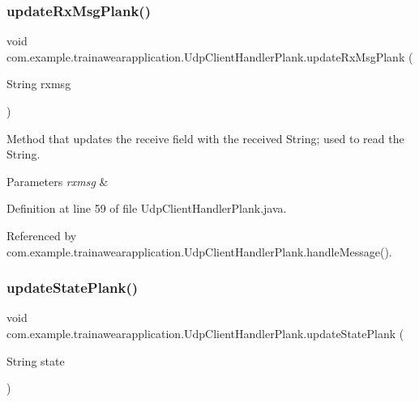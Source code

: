 \subsubsection{\texorpdfstring{updateRxMsgPlank()}{updateRxMsgPlank()}}
{\footnotesize\ttfamily void com.\+example.\+trainawearapplication.\+Udp\+Client\+Handler\+Plank.\+update\+Rx\+Msg\+Plank (\begin{DoxyParamCaption}\item[{String}]{rxmsg }\end{DoxyParamCaption})\hspace{0.3cm}{\ttfamily [private]}}



Method that updates the receive field with the received String; used to read the String. 


\begin{DoxyParams}{Parameters}
{\em rxmsg} & \\
\hline
\end{DoxyParams}


Definition at line 59 of file Udp\+Client\+Handler\+Plank.\+java.


\begin{DoxyCode}{0}

\end{DoxyCode}


Referenced by com.\+example.\+trainawearapplication.\+Udp\+Client\+Handler\+Plank.\+handle\+Message().

\mbox{\label{classcom_1_1example_1_1trainawearapplication_1_1_udp_client_handler_plank_a68ceca8349b52704db25834ca5eb5b38}} 
\subsubsection{\texorpdfstring{updateStatePlank()}{updateStatePlank()}}
{\footnotesize\ttfamily void com.\+example.\+trainawearapplication.\+Udp\+Client\+Handler\+Plank.\+update\+State\+Plank (\begin{DoxyParamCaption}\item[{String}]{state }\end{DoxyParamCaption})\hspace{0.3cm}{\ttfamily [private]}}



